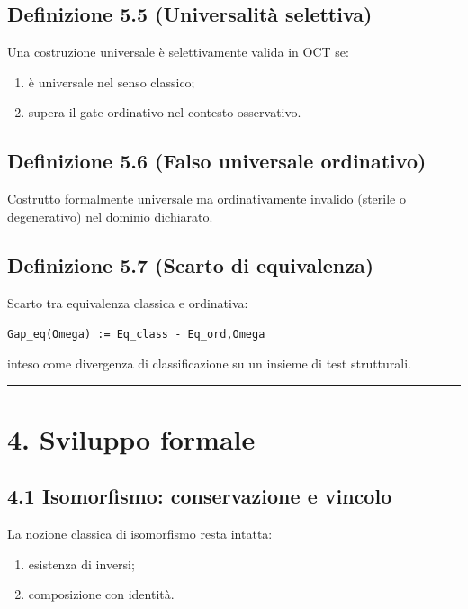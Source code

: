 \subsection{Definizione 5.5 (Universalità selettiva)}

Una costruzione universale è selettivamente valida in OCT se:

\begin{enumerate}
\def\labelenumi{\arabic{enumi}.}
\tightlist
\item
  è universale nel senso classico;
\item
  supera il gate ordinativo nel contesto osservativo.
\end{enumerate}

\subsection{Definizione 5.6 (Falso universale ordinativo)}

Costrutto formalmente universale ma ordinativamente invalido (sterile o degenerativo) nel dominio dichiarato.

\subsection{Definizione 5.7 (Scarto di equivalenza)}

Scarto tra equivalenza classica e ordinativa:

\texttt{Gap\_eq(Omega)\ :=\ Eq\_class\ -\ Eq\_ord,Omega}

inteso come divergenza di classificazione su un insieme di test strutturali.

\begin{center}\rule{0.5\linewidth}{0.5pt}\end{center}

\section{4. Sviluppo formale}

\subsection{4.1 Isomorfismo: conservazione e vincolo}

La nozione classica di isomorfismo resta intatta:

\begin{enumerate}
\def\labelenumi{\arabic{enumi}.}
\tightlist
\item
  esistenza di inversi;
\item
  composizione con identità.
\end{enumerate}

